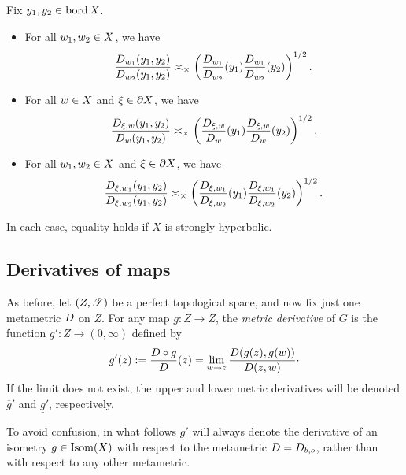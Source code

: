 \begin{proposition}
\label{propositionGMVT}
Fix $y_1,y_2\in\operatorname{bord} X$.
\begin{itemize}
\item[(i)] For all $w_1,w_2\in X$, we have
\[
\frac{D_{w_1}(y_1,y_2)}{D_{w_2}(y_1,y_2)} \asymp_\times \left(\frac{D_{w_1}}{D_{w_2}}(y_1)\frac{D_{w_1}}{D_{w_2}}(y_2)\right)^{1/2}.
\]
\item[(ii)] For all $w\in X$ and $\xi\in\partial X$, we have
\[
\frac{D_{\xi,w}(y_1,y_2)}{D_w(y_1,y_2)} \asymp_\times \left(\frac{D_{\xi,w}}{D_w}(y_1)\frac{D_{\xi,w}}{D_w}(y_2)\right)^{1/2}.
\]
\item[(iii)] For all $w_1,w_2\in X$ and $\xi\in\partial X$, we have
\[
\frac{D_{\xi,w_1}(y_1,y_2)}{D_{\xi,w_2}(y_1,y_2)} \asymp_\times \left(\frac{D_{\xi,w_1}}{D_{\xi,w_2}}(y_1)\frac{D_{\xi,w_1}}{D_{\xi,w_2}}(y_2)\right)^{1/2}.
\]
\end{itemize}
In each case, equality holds if $X$ is strongly hyperbolic.
\end{proposition}

\subsection{Derivatives of maps}
\label{subsubsectionderivativemaps}
As before, let $(Z,\mathscr T)$ be a perfect topological space, and now fix just one metametric $D$ on $Z$. For any map $g:Z\to Z$, the \emph{metric derivative} of $G$ is the function $g':Z\to(0,\infty)$ defined by
\[
g'(z) := \frac{D\circ g}{D}(z) = \lim_{w\to z}\frac{D(g(z),g(w))}{D(z,w)}\cdot
\]
If the limit does not exist, the upper and lower metric derivatives will be denoted $\overline g'$ and $\underline g'$, respectively.

\begin{remark}
\label{remarkconfusion}
To avoid confusion, in what follows $g'$ will always denote the derivative of an isometry $g\in\operatorname{Isom}(X)$ with respect to the metametric $D = D_{b,o}$, rather than with respect to any other metametric.
\end{remark}


